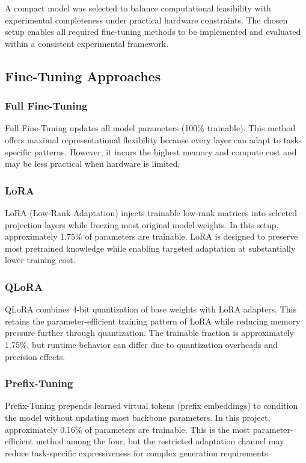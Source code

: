 \documentclass[11pt]{article}
\begin{document}
A compact model was selected to balance computational feasibility with experimental completeness under practical hardware constraints. The chosen setup enables all required fine-tuning methods to be implemented and evaluated within a consistent experimental framework.

\subsection{Fine-Tuning Approaches}
\subsubsection{Full Fine-Tuning}
Full Fine-Tuning updates all model parameters (100\% trainable). This method offers maximal representational flexibility because every layer can adapt to task-specific patterns. However, it incurs the highest memory and compute cost and may be less practical when hardware is limited.

\subsubsection{LoRA}
LoRA (Low-Rank Adaptation) injects trainable low-rank matrices into selected projection layers while freezing most original model weights. In this setup, approximately 1.75\% of parameters are trainable. LoRA is designed to preserve most pretrained knowledge while enabling targeted adaptation at substantially lower training cost.

\subsubsection{QLoRA}
QLoRA combines 4-bit quantization of base weights with LoRA adapters. This retains the parameter-efficient training pattern of LoRA while reducing memory pressure further through quantization. The trainable fraction is approximately 1.75\%, but runtime behavior can differ due to quantization overheads and precision effects.

\subsubsection{Prefix-Tuning}
Prefix-Tuning prepends learned virtual tokens (prefix embeddings) to condition the model without updating most backbone parameters. In this project, approximately 0.16\% of parameters are trainable. This is the most parameter-efficient method among the four, but the restricted adaptation channel may reduce task-specific expressiveness for complex generation requirements.
\end{document}
